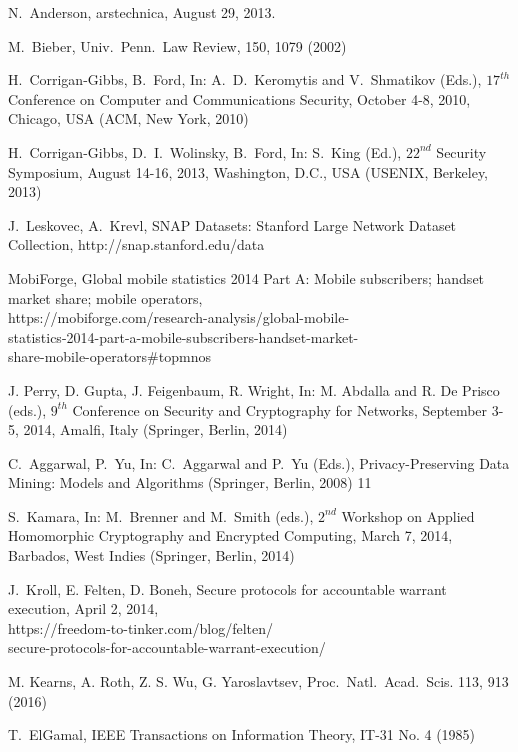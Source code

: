 \documentclass[USenglish,oneside,twocolumn]{article}
\begin{document}
\begin{thebibliography}{99}
 N.~Anderson, arstechnica, August 29, 2013. 


 M.~Bieber, Univ.~Penn.~Law Review, 150, 1079 (2002)

 H.~Corrigan-Gibbs, B.~Ford, In: A.~D.~Keromytis and 
V.~Shmatikov (Eds.), $17^{th}$ Conference on Computer and Communications 
Security, October 4-8, 2010, Chicago, USA (ACM, New York, 2010)

 H.~Corrigan-Gibbs, D.~I.~Wolinsky, B.~Ford, In: 
S.~King (Ed.), $22^{nd}$ Security Symposium, August 14-16, 2013, 
Washington, D.C., USA (USENIX, Berkeley, 2013) 

 J.~Leskovec, A.~Krevl, SNAP Datasets: 
Stanford Large Network Dataset Collection, 
http://snap.stanford.edu/data

 MobiForge, Global mobile statistics 2014 Part A: 
Mobile subscribers; handset market share; mobile operators,\\ 
https://mobiforge.com/research-analysis/global-mobile-\\
statistics-2014-part-a-mobile-subscribers-handset-market-\\
share-mobile-operators\#topmnos

 J. Perry, D. Gupta, J. Feigenbaum, R. Wright,
In: M. Abdalla and R. De Prisco (eds.), $9^{th}$ Conference on Security and 
Cryptography for Networks, September 3-5, 2014, Amalfi, Italy (Springer,
Berlin, 2014)

 C.~Aggarwal, P.~Yu, In: C.~Aggarwal and P.~Yu (Eds.), 
Privacy-Preserving Data Mining: Models and Algorithms 
(Springer, Berlin, 2008) 11

 S.~Kamara, In: M.~Brenner and M.~Smith (eds.), 
$2^{nd}$ Workshop on Applied Homomorphic Cryptography and Encrypted Computing, 
March 7, 2014, Barbados, West Indies (Springer, Berlin, 2014)

 J.~Kroll, E. Felten, D. Boneh, Secure protocols for
accountable warrant execution, April 2, 2014,\\
https://freedom-to-tinker.com/blog/felten/\\
secure-protocols-for-accountable-warrant-execution/

 M. Kearns, A. Roth, Z. S. Wu, G. Yaroslavtsev, 
Proc.~Natl.~Acad.~Scis. 113, 913 (2016)

 T.~ElGamal, IEEE Transactions on Information Theory, IT-31 No. 4 (1985)


\end{thebibliography}
\end{document}
